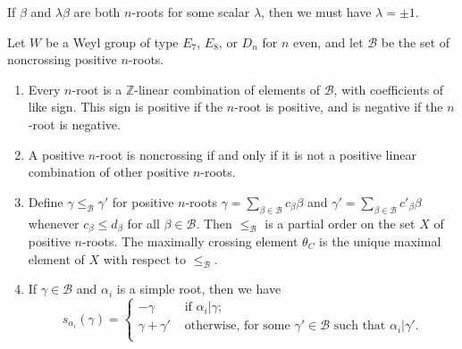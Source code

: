 \documentclass[10pt,a4paper]{amsart}
\newcommand{\Be}{\mathcal B}
\newcommand{\Z}{{\mathbb Z}}
\newcommand{\al}{\alpha}
\newcommand{\be}{\beta}
\begin{document}
\begin{lemma}
    \label{lem:pm1}
{If $\be$ and $\lambda \be$ are both $n$-roots for some scalar $\lambda$, then we must have $\lambda = \pm 1$.}
\end{lemma}

\begin{theorem}\label{thm:positive}
Let $W$ be a Weyl group of type $E_7$, $E_8$, or $D_n$ for $n$ even, and let
$\Be$ be the set of noncrossing positive $n$-roots.
\begin{enumerate}
    \item[{\rm (i)}]{Every $n$-root is a $\Z$-linear combination of elements of
     $\Be$, with coefficients of like sign. This sign is positive if the
 $n$-root is positive, and is negative if the $n$-root is negative.}
\item[{\rm (ii)}]{A positive $n$-root is noncrossing if and only if it is not a
     positive linear combination of other positive $n$-roots.}
 \item[{\rm (iii)}] Define $\gamma\le_\Be\gamma'$ for positive $n$-roots
     $\gamma=\sum_{\be \in \Be} c_\be \be$ and $\gamma'=\sum_{\be\in \Be}c'_\be
     \be$ whenever $c_\be \leq d_\be$ for all $\be \in \Be$. Then $\le_\Be$ is a
     partial order on the set $X$ of positive $n$-roots. The maximally crossing
     element $\theta_C$ is the unique maximal element of $X$ with respect to
     $\le_\Be$.
 \item[{\rm (iv)}]{If $\gamma \in \Be$ and $\al_i$ is a simple root, then we
     have $$ s_{\al_i}(\gamma) = \begin{cases} -\gamma & \text{\ if\ } \al_i |
         \gamma;\\ \gamma + \gamma' & \text{\ otherwise,\ for\ some\ } \gamma'
         \in \Be {\text{\ such\ that\ }} \al_i | \gamma'.\\
 \end{cases} $$}
\end{enumerate}\end{theorem}
\end{document}
